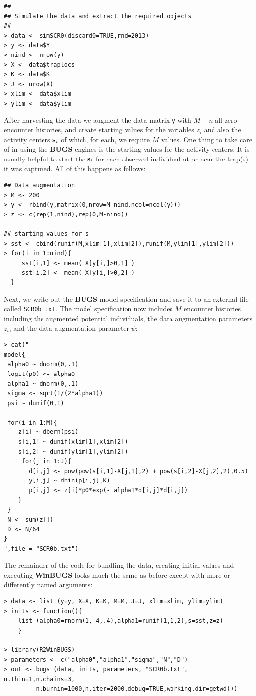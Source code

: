 {\small
\begin{verbatim}
##
## Simulate the data and extract the required objects
##
> data <- simSCR0(discard0=TRUE,rnd=2013)
> y <- data$Y
> nind <- nrow(y)
> X <- data$traplocs
> K <- data$K
> J <- nrow(X)
> xlim <- data$xlim
> ylim <- data$ylim
\end{verbatim}
}
 After harvesting the data we
 augment the data matrix \mbox{\tt y}
with $M-n$ all-zero encounter histories, and create starting
values for the variables $z_{i}$ and also the activity centers ${\bf
  s}_{i}$ of which, for each, we require $M$ values.
 One thing to take care of in using the {\bf BUGS}
engines is the starting values for the activity centers. It is usually
helpful to start the ${\bf s}_{i}$ for each observed individual at or
near the trap(s) it was captured. All of this happens as follows:
{\small
\begin{verbatim}
## Data augmentation
> M <- 200
> y <- rbind(y,matrix(0,nrow=M-nind,ncol=ncol(y)))
> z <- c(rep(1,nind),rep(0,M-nind))

## starting values for s
> sst <- cbind(runif(M,xlim[1],xlim[2]),runif(M,ylim[1],ylim[2]))
> for(i in 1:nind){
     sst[i,1] <- mean( X[y[i,]>0,1] )
     sst[i,2] <- mean( X[y[i,]>0,2] )
  }
\end{verbatim}
}
Next, we write out the {\bf BUGS} model specification and save it to
an external file called \mbox{\tt SCR0b.txt}. The model
 specification  now includes $M$
encounter histories including the augmented potential individuals, the
data augmentation parameters $z_{i}$, and the data augmentation
parameter $\psi$:
{\small
\begin{verbatim}
> cat("
model{
 alpha0 ~ dnorm(0,.1)
 logit(p0) <- alpha0
 alpha1 ~ dnorm(0,.1)
 sigma <- sqrt(1/(2*alpha1))
 psi ~ dunif(0,1)

 for(i in 1:M){
    z[i] ~ dbern(psi)
    s[i,1] ~ dunif(xlim[1],xlim[2])
    s[i,2] ~ dunif(ylim[1],ylim[2])
     for(j in 1:J){
       d[i,j] <- pow(pow(s[i,1]-X[j,1],2) + pow(s[i,2]-X[j,2],2),0.5)
       y[i,j] ~ dbin(p[i,j],K)
       p[i,j] <- z[i]*p0*exp(- alpha1*d[i,j]*d[i,j])
    }
 }
 N <- sum(z[])
 D <- N/64
}
",file = "SCR0b.txt")
\end{verbatim}
}
The remainder of the code for bundling the data, creating initial
values and executing {\bf WinBUGS} looks much the same as before
except with more or differently named arguments:
{\small
\begin{verbatim}
> data <- list (y=y, X=X, K=K, M=M, J=J, xlim=xlim, ylim=ylim)
> inits <- function(){
    list (alpha0=rnorm(1,-4,.4),alpha1=runif(1,1,2),s=sst,z=z)
    }

> library(R2WinBUGS)
> parameters <- c("alpha0","alpha1","sigma","N","D")
> out <- bugs (data, inits, parameters, "SCR0b.txt", n.thin=1,n.chains=3,
         n.burnin=1000,n.iter=2000,debug=TRUE,working.dir=getwd())
\end{verbatim}
}

